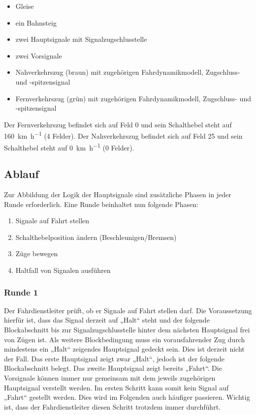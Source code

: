   \begin{itemize}
    \item Gleise
    \item ein Bahnsteig
    \item zwei Hauptsignale mit Signalzugschlusstelle
    \item zwei Vorsignale
    \item Nahverkehrszug (braun) mit zugehörigen Fahrdynamikmodell, Zugschluss- und -spitzensignal
    \item Fernverkehrszug (grün) mit zugehörigen Fahrdynamikmodell, Zugschluss- und -spitzensignal
  \end{itemize}

\setup
  Der Fernverkehrszug befindet sich auf Feld 0 und sein Schalthebel steht auf \SI{160}{\kilo\metre\per\hour} (4 Felder).
  Der Nahverkehrszug befindet sich auf Feld 25 und sein Schalthebel steht auf \SI{0}{\kilo\metre\per\hour} (0 Felder).


\subsection*{Ablauf}
  Zur Abbildung der Logik der Hauptsignale sind zusätzliche Phasen in jeder Runde erforderlich. Eine Runde beinhaltet nun folgende Phasen:
  \begin{enumerate}
    \item Signale auf Fahrt stellen
    \item Schalthebelposition ändern (Beschleunigen/Bremsen)
    \item Züge bewegen
    \item Haltfall von Signalen ausführen
  \end{enumerate}

\subsubsection*{Runde 1}
   Der Fahrdienstleiter prüft, ob er Signale auf Fahrt stellen darf. Die Voraussetzung hierfür ist, dass das Signal derzeit auf „Halt“ steht und der folgende Blockabschnitt bis zur Signalzugschlusstelle hinter dem nächsten Hauptsignal frei von Zügen ist. Als weitere Blockbedingung muss ein vorausfahrender Zug durch mindestens ein „Halt“ zeigendes Hauptsignal gedeckt sein. Dies ist derzeit nicht der Fall. Das erste Hauptsignal zeigt zwar „Halt“, jedoch ist der folgende Blockabschnitt belegt. Das zweite Hauptsignal zeigt bereits „Fahrt“. Die Vorsignale können immer nur gemeinsam mit dem jeweils zugehörigen Hauptsignal verstellt werden. Im ersten Schritt kann somit kein Signal auf „Fahrt“ gestellt werden. Dies wird im Folgenden auch häufiger passieren. Wichtig ist, dass der Fahrdienstleiter diesen Schritt trotzdem immer durchführt.

